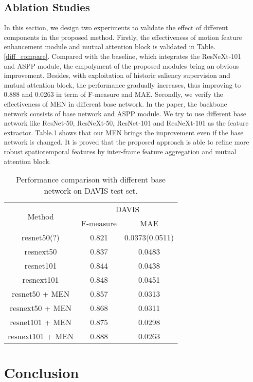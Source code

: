 \documentclass[12pt]{article}
\begin{document}
\subsection{Ablation Studies}

In this section, we design two experiments to validate the effect of different components in the proposed method. Firstly, the effectiveness of motion feature enhancement module and mutual attention block is validated in Table.\ref{diff_compare}. Compared with the baseline, which integrates the ResNeXt-101 and ASPP module, the empolyment of the proposed modules bring an obvious improvement. Besides, with exploitation of historic saliency supervision and mutual attention block, the performance gradually increases, thus improving to 0.888 and 0.0263 in term of F-measure and MAE. Secondly, we verify the effectiveness of MEN in different base network. In the paper, the backbone network consists of base network and ASPP module. We try to use different base network like ResNet-50, ResNeXt-50, ResNet-101 and ResNeXt-101 as the feature extractor. Table.\ref{diff_compare2} shows that our MEN brings the improvement even if the base network is changed. It is proved that the proposed approach is able to refine more robust spatiotemporal features by inter-frame feature aggregation and mutual attention block.

\begin{table}[]
\caption{Performance comparison with different base network on DAVIS test set.}
\label{diff_compare2}
\begin{tabular}{ccc}
\multirow{2}{*}{Method} & \multicolumn{2}{c}{DAVIS} \\
 & F-measure & MAE \\
resnet50(?)  & 0.821 & \multicolumn{1}{l}{0.0373(0.0511)} \\
resnext50 & 0.837 & 0.0483 \\
resnet101 & 0.844 & 0.0438 \\
resnext101 & 0.848 & 0.0451 \\
resnet50 + MEN & 0.857 & 0.0313 \\	
resnext50 + MEN & 0.868 & 0.0311 \\
resnet101 + MEN & 0.875 & 0.0298 \\
resnext101 + MEN & 0.888 & 0.0263
\end{tabular}
\end{table}

\section{Conclusion}
\end{document}
